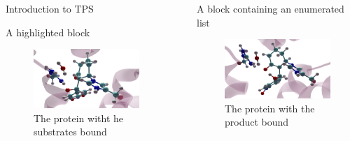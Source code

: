 \documentclass[final]{beamer}
\newlength{\sepwidth}
\newlength{\colwidth}
\newcommand{\separatorcolumn}{\begin{column}{\sepwidth}\end{column}}
\begin{document}
\begin{frame}[t]
\begin{columns}[t]
\begin{column}{\colwidth}
\begin{block}{Introduction to TPS}
    

  \end{block}

  \begin{block}{A highlighted block}

    \begin{figure}
        \includegraphics[scale=0.15]{figures/reac-120.png}
        \caption{The protein witht he substrates bound}
    \end{figure}

  \end{block}

\end{column}

\separatorcolumn

\begin{column}{\colwidth}

  \begin{block}{A block containing an enumerated list}
   \begin{figure}
        \centering
        \includegraphics[scale=0.25]{figures/prod-120.png}
        \caption{The protein with the product bound}
    \end{figure}
    

\end{block}
\end{column}
\end{columns}
\end{frame}
\end{document}
